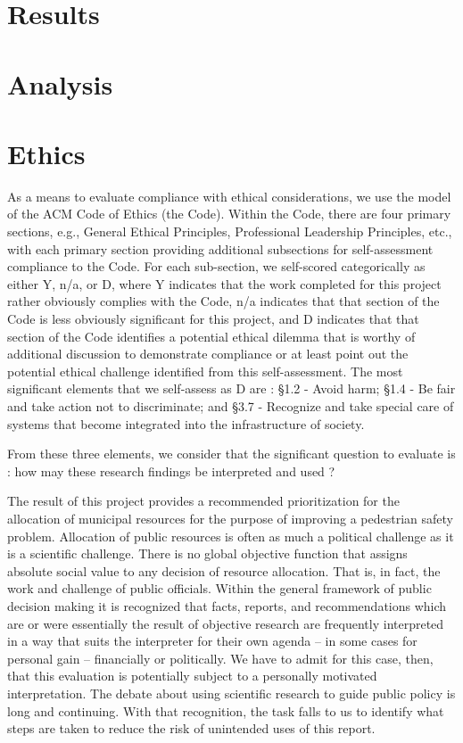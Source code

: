 \documentclass{llncs}
\begin{document}
\section{Results}
%
%
\section{Analysis}
%
%
\section{Ethics}
%
As a means to evaluate compliance with ethical considerations, we use the model of the ACM Code of Ethics  (the Code). Within the Code, there are four primary sections, e.g., General Ethical Principles, Professional Leadership Principles, etc., with each primary section providing additional subsections for self-assessment compliance to the Code. For each sub-section, we self-scored categorically as either Y, n/a, or D, where Y indicates that the work completed for this project rather obviously complies with the Code, n/a indicates that that section of the Code is less obviously significant for this project, and D indicates that that section of the Code identifies a potential ethical dilemma that is worthy of additional discussion to demonstrate compliance or at least point out the potential ethical challenge identified from this self-assessment.
The most significant elements that we self-assess as D are : \S 1.2 - Avoid harm; \S 1.4 - Be fair and take action not to discriminate; and \S 3.7 - Recognize and take special care of systems that become integrated into the infrastructure of society.

From these three elements, we consider that the significant question to evaluate is : how may these research findings be interpreted and used ?

The result of this project provides a recommended prioritization for the allocation of municipal resources for the purpose of improving a pedestrian safety problem. Allocation of  public resources is often as much a political challenge as it is a scientific challenge. There is no global objective function that assigns absolute social value to any decision of resource allocation. That is, in fact, the work and challenge of public officials. Within the general framework of public decision making it is recognized that facts, reports, and recommendations which are or were essentially the result of objective research are frequently interpreted in a way that suits the interpreter for their own agenda – in some cases for personal gain – financially or politically. We have to admit for this case, then, that this evaluation is potentially subject to a personally motivated interpretation. The debate about using scientific research to guide public policy is long and continuing. With that recognition, the task falls to us to identify what steps are taken to reduce the risk of unintended uses of this report.
\end{document}
